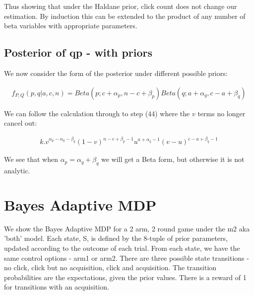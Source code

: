\documentclass[11pt,a4,singlespacing,titlepagenumber=on]{scrreprt}
\numberwithin{equation}{chapter} %
\theoremstyle{remark}
\begin{document}
Thus showing that under the Haldane prior, click count does not change our estimation. By induction this can be extended to the product of any number of beta variables with appropriate parameters.

\subsection{Posterior of qp - with priors}

We now consider the form of the posterior under different possible priors:

\begin{align}
 f_{P,Q}(p,q|a,c,n) = Beta(p;c+\alpha_p,n-c+\beta_p) Beta(q;a+\alpha_q,c-a+\beta_q)
\end{align}

We can follow the calculation through to step (44) where the $v$ terms no longer cancel out:

\begin{align}
 k . v^{\alpha_p - \alpha_q - \beta_q}(1-v)^{n-c+\beta_p-1} u^{a+\alpha_q-1} (v - u)^{c-a+\beta_q-1}
\end{align}

We see that when $ \alpha_p = \alpha_q + \beta_q $ we will get a Beta form, but otherwise it is not analytic. 

\section{Bayes Adaptive MDP}

We show the Bayes Adaptive MDP for a 2 arm, 2 round game under the m2 aka 'both' model. Each state, S, is defined by the 8-tuple of prior parameters, updated according to the outcome of each trial. From each state, we have the same control options - arm1 or arm2. There are three possible state transitions - no click, click but no acquisition, click and acquisition. The transition probabilities are the expectations, given the prior values. There is a reward of 1 for transitions with an acquisition.
\end{document}
